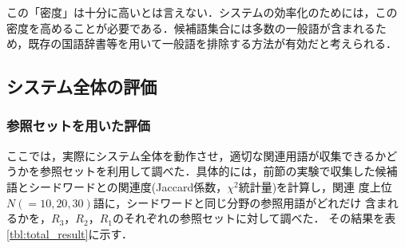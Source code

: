 この「密度」は十分に高いとは言えない．システムの効率化のためには，この
密度を高めることが必要である．候補語集合には多数の一般語が含まれるた
め，既存の国語辞書等を用いて一般語を排除する方法が有効だと考えられる．


\subsection{システム全体の評価}\label{sec:ex_total}

\subsubsection{参照セットを用いた評価}

ここでは，実際にシステム全体を動作させ，適切な関連用語が収集できるかど
うかを参照セットを利用して調べた．具体的には，前節の実験で収集した候補
語とシードワードとの関連度(Jaccard係数，$\chi ^2$統計量)を計算し，関連
度上位$N(=10, 20, 30)$語に，シードワードと同じ分野の参照用語がどれだけ
含まれるかを，$R_3$，$R_2$，$R_1$のそれぞれの参照セットに対して調べた．
その結果を\mbox{表\ref{tbl:total_result}}に示す．

